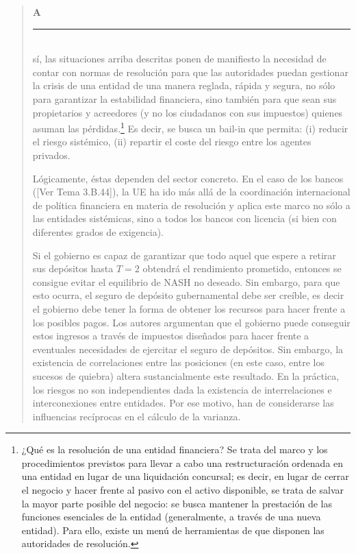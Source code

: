 \documentclass[10pt,a4paper]{article}
\newenvironment{specialblock}[1]{%
      \begin{quote} %
      \small %
      \noindent\textbf{#1}\\[-0.3em] %
      \rule{\linewidth}{0.4pt}\\[0.6em]}{
      \end{quote}}
\newcommand{\authorfont}[1]{{\fontfamily{EBGaramond-TLF}\selectfont #1}}
\begin{document}
\begin{specialblock}
    Así, las situaciones arriba descritas ponen de manifiesto la necesidad de contar con normas de resolución para que las autoridades puedan gestionar la crisis de una entidad de una manera reglada, rápida y segura, no sólo para garantizar la estabilidad financiera, sino también para que sean sus propietarios y acreedores (y no los ciudadanos con sus impuestos) quienes asuman las pérdidas.\footnote{%
        ¿Qué es la resolución de una entidad financiera? Se trata del marco y los procedimientos previstos para llevar a cabo una restructuración ordenada en una entidad en lugar de una liquidación concursal; es decir, en lugar de cerrar el negocio y hacer frente al pasivo con el activo disponible, se trata de salvar la mayor parte posible del negocio: se busca mantener la prestación de las funciones esenciales de la entidad (generalmente, a través de una nueva entidad). Para ello, existe un menú de herramientas de que disponen las autoridades de resolución.
    } Es decir, se busca un bail-in que permita: (i) reducir el riesgo sistémico, (ii) repartir el coste del riesgo entre los agentes privados. 
    
    Lógicamente, éstas dependen del sector concreto. En el caso de los bancos ([\authorfont{Ver Tema 3.B.44}]), la UE ha ido más allá de la coordinación internacional de política financiera en materia de resolución y aplica este marco no sólo a las entidades sistémicas, sino a todos los bancos con licencia (si bien con diferentes grados de exigencia).
    
    Si el gobierno es capaz de garantizar que todo aquel que espere a retirar sus depósitos hasta $T=2$ obtendrá el rendimiento prometido, entonces se consigue evitar el equilibrio de NASH no deseado. Sin embargo, para que esto ocurra, el seguro de depósito gubernamental debe ser creíble, es decir el gobierno debe tener la forma de obtener los recursos para hacer frente a los posibles pagos. Los autores argumentan que el gobierno puede conseguir estos ingresos a través de impuestos diseñados para hacer frente a eventuales necesidades de ejercitar el seguro de depósitos.  Sin embargo, la existencia de correlaciones entre las posiciones (en este caso, entre los sucesos de quiebra) altera sustancialmente este resultado. En la práctica, los riesgos no son independientes dada la existencia de interrelaciones e interconexiones entre entidades. Por ese motivo, han de considerarse las influencias recíprocas en el cálculo de la varianza.
\end{specialblock}
\end{document}

